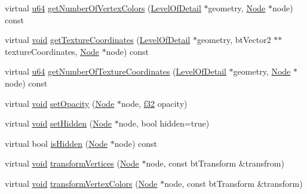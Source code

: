 \begin{DoxyCompactItemize}
virtual \mbox{\hyperlink{_util_8h_ad758b7a5c3f18ed79d2fcd23d9f16357}{u64}} \mbox{\hyperlink{classnjli_1_1_sprite2_d_a2ecb47d5889333f482406230fe470e34}{get\+Number\+Of\+Vertex\+Colors}} (\mbox{\hyperlink{classnjli_1_1_level_of_detail}{Level\+Of\+Detail}} $\ast$geometry, \mbox{\hyperlink{classnjli_1_1_node}{Node}} $\ast$node) const
\item 
virtual \mbox{\hyperlink{_thread_8h_af1e856da2e658414cb2456cb6f7ebc66}{void}} \mbox{\hyperlink{classnjli_1_1_sprite2_d_ac1e43c1713d68560888fbfdaaff7128c}{get\+Texture\+Coordinates}} (\mbox{\hyperlink{classnjli_1_1_level_of_detail}{Level\+Of\+Detail}} $\ast$geometry, bt\+Vector2 $\ast$$\ast$texture\+Coordinates, \mbox{\hyperlink{classnjli_1_1_node}{Node}} $\ast$node) const
\item 
virtual \mbox{\hyperlink{_util_8h_ad758b7a5c3f18ed79d2fcd23d9f16357}{u64}} \mbox{\hyperlink{classnjli_1_1_sprite2_d_a68ba69857ee4bb27dbf9072da12046ab}{get\+Number\+Of\+Texture\+Coordinates}} (\mbox{\hyperlink{classnjli_1_1_level_of_detail}{Level\+Of\+Detail}} $\ast$geometry, \mbox{\hyperlink{classnjli_1_1_node}{Node}} $\ast$node) const
\item 
virtual \mbox{\hyperlink{_thread_8h_af1e856da2e658414cb2456cb6f7ebc66}{void}} \mbox{\hyperlink{classnjli_1_1_sprite2_d_abf2ee9acb5cd301b5a4029181be7b155}{set\+Opacity}} (\mbox{\hyperlink{classnjli_1_1_node}{Node}} $\ast$node, \mbox{\hyperlink{_util_8h_a5f6906312a689f27d70e9d086649d3fd}{f32}} opacity)
\item 
virtual \mbox{\hyperlink{_thread_8h_af1e856da2e658414cb2456cb6f7ebc66}{void}} \mbox{\hyperlink{classnjli_1_1_sprite2_d_a67ddaace4a3a936408068657d617a64f}{set\+Hidden}} (\mbox{\hyperlink{classnjli_1_1_node}{Node}} $\ast$node, bool hidden=true)
\item 
virtual bool \mbox{\hyperlink{classnjli_1_1_sprite2_d_a875c4e8392568fdd347c9730aedde9a4}{is\+Hidden}} (\mbox{\hyperlink{classnjli_1_1_node}{Node}} $\ast$node) const
\item 
virtual \mbox{\hyperlink{_thread_8h_af1e856da2e658414cb2456cb6f7ebc66}{void}} \mbox{\hyperlink{classnjli_1_1_sprite2_d_a357c517b9064bf729722e3cff9312dd0}{transform\+Vertices}} (\mbox{\hyperlink{classnjli_1_1_node}{Node}} $\ast$node, const bt\+Transform \&transfrom)
\item 
virtual \mbox{\hyperlink{_thread_8h_af1e856da2e658414cb2456cb6f7ebc66}{void}} \mbox{\hyperlink{classnjli_1_1_sprite2_d_a9faa5df865ca871af37dea98682a52a2}{transform\+Vertex\+Colors}} (\mbox{\hyperlink{classnjli_1_1_node}{Node}} $\ast$node, const bt\+Transform \&transform)
$$
\end{DoxyCompactItemize}
